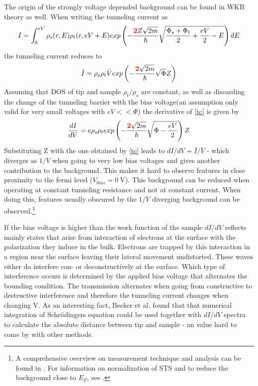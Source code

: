 The origin of the strongly voltage depended background can be found in WKB theory as well.
When writing the tunneling current as 
$$ I=\int_0^{eV}\rho_s(r,E)\rho_t(r,eV+E)exp\left(-\frac{\textcolor{red}{\textbf{2}}Z\sqrt{2m}}{\hbar}\sqrt{\frac{\Phi_s+\Phi_t}{2}+\frac{eV}{2}-E}\right)dE $$
the tunneling current reduces to 
\begin{equation}
\bar I=\rho_s\rho_t \bar V exp\left(-\frac{\textcolor{red}{\textbf{2}}\sqrt{2m}}{\hbar}\sqrt{\Phi}Z\right)
\label{tc}
\end{equation}
Assuming that DOS of tip and sample $\rho_t/\rho_s$ are constant, as well as discarding the change of the tunneling barrier with the bias voltage(an assumption only valid for very small voltages with $eV<<\Phi$) the derivative of \eqref{tc} is given by
$$\frac{dI}{dV}=e\rho_s\rho_texp\left(-\frac{\textcolor{red}{\textbf{2}}\sqrt{2m}}{\hbar}\sqrt{\Phi-\frac{eV}{2}}\right)Z$$
Substituting Z with the one obtained by \eqref{tc} leads to $dI/dV= \bar I / \bar V$ - which diverges as  $1/V$ when going to very low bias voltages and gives another contribution to the background. This makes it hard to observe features in close proximity to the fermi level ($V_{bias}=\SI{0}{\volt}$). This background can be reduced when operating at constant tunneling resistance and not at constant current. When doing this, features usually obscured by the $1/V$ diverging background can be observed.\footnote{A comprehensive overview on measurement technique and analysis can be found in \cite{bonnell_scanning_1993}. For information on normalization of STS and to reduce the background close to $E_F$, see \cite{feenstra_tunneling_1987}.}

If the bias voltage is higher than the work function of the sample $dI/dV$ reflects mainly states that arise from interaction of electrons at the surface with the polarization they induce in the bulk. Electrons are trapped by this interaction in a region near the surface leaving their lateral movement undistorted. These waves either do interfere con- or deconstructively at the surface. Which type of interference occurs is determined by the applied bias voltage that alternates the bounding condition. The transmission alternates when going from constructive to destructive interference and therefore the tunneling current changes when changing V. 
As an interesting fact, Becker et al.\cite{becker_electron_1985} found that that numerical integration of Schr\"odingers equation could be used together with $dI/dV$ spectra to calculate the absolute distance between tip and sample - an value hard to come by with other methods.

